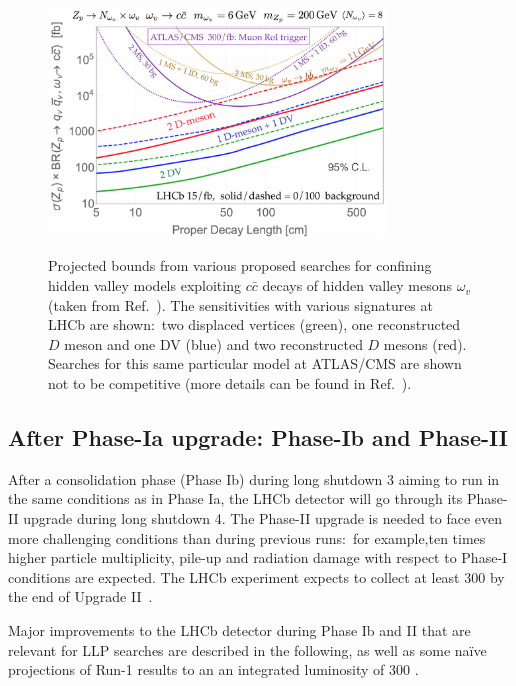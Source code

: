 \begin{figure}[t]
  \centering
  {\includegraphics[width=0.8\textwidth]{figures/lhcb_hvlimits2.png}}
  \caption{Projected bounds from various proposed searches for confining hidden valley models exploiting $c\bar{c}$ decays of hidden valley mesons $\omega_v$ (taken from Ref.~\cite{Pierce:2017taw}). The sensitivities with various signatures at LHCb are shown:~two displaced vertices (green), one reconstructed $D$ meson and one DV (blue) and two reconstructed $D$ mesons (red). Searches for this same particular model at ATLAS/CMS are shown not to be competitive (more details can be found in Ref.~\cite{Pierce:2017taw}).}
  \label{fig:HVlim}
\end{figure}

\subsection{After Phase-Ia upgrade: Phase-Ib and Phase-II}
\label{sec:ulhcbphaseii}


After a consolidation phase (Phase Ib) during long shutdown 3 aiming to run in the same conditions as in Phase Ia, the LHCb detector will go through its Phase-II upgrade during long shutdown 4. The Phase-II upgrade is needed to face even more challenging conditions than during previous runs:~for example,ten times higher particle multiplicity, pile-up and radiation damage with respect to Phase-I conditions are expected. The LHCb experiment expects to collect at least 300 \invfb by the end of
Upgrade II~\cite{LHCbUpgradeIIPC}. 

Major improvements to the LHCb detector during Phase Ib and II that are relevant for LLP searches are described in the following, as well as some na\"ive projections of Run-1 results to an an integrated luminosity of 300 \invfb. 

